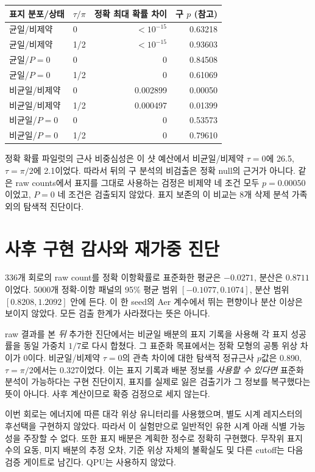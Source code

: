 \documentclass[11pt,a4paper]{article}
\begin{document}
\begin{center}
\begin{tabular}{@{}llrr@{}}
\toprule
표지 분포/상태 & $\tau/\pi$ & 정확 최대 확률 차이 & 구 $p$ (참고) \\
\midrule
균일/비제약 & 0 & $<10^{-15}$ & 0.63218 \\
균일/비제약 & 1/2 & $<10^{-15}$ & 0.93603 \\
균일/$P=0$ & 0 & 0 & 0.84508 \\
균일/$P=0$ & 1/2 & 0 & 0.61069 \\
비균일/비제약 & 0 & 0.002899 & 0.00050 \\
비균일/비제약 & 1/2 & 0.000497 & 0.01399 \\
비균일/$P=0$ & 0 & 0 & 0.53573 \\
비균일/$P=0$ & 1/2 & 0 & 0.79610 \\
\bottomrule
\end{tabular}
\end{center}

정확 확률 파일럿의 근사 비중심성은 이 샷 예산에서 비균일/비제약
$\tau=0$에 26.5, $\tau=\pi/2$에 2.1이었다. 따라서 뒤의
구 분석의 비검출은 정확 null의 근거가 아니다. 같은 raw counts에서 표지를
그대로 사용하는 검정은 비제약 네 조건 모두 $p=0.00050$이었고,
$P=0$ 네 조건은 검출되지 않았다. 표지 보존의 이 비교는
8개 삭제 분석 가족 외의 탐색적 진단이다.

\section{사후 구현 감사와 재가중 진단}
336개 회로의 raw count를 정확 이항확률로 표준화한 평균은
$-0.0271$, 분산은 $0.8711$이었다. 5000개 정확-이항 패널의
95\% 평균 범위 $[-0.1077,0.1074]$, 분산 범위
$[0.8208,1.2092]$ 안에 든다. 이 한 seed의 Aer 계수에서
뛰는 편향이나 분산 이상은 보이지 않았다. 모든 검출 한계가
사라졌다는 뜻은 아니다.

raw 결과를 본 \emph{뒤} 추가한 진단에서는 비균일 배분의 표지
기록을 사용해 각 표지 성공률을 동일 가중치 $1/7$로 다시 합쳤다.
그 표준화 목표에서는 정확 모형의 공통 위상 차이가 0이다.
비균일/비제약 $\tau=0$의 관측 차이에 대한 탐색적 정규근사
$p$값은 0.890, $\tau=\pi/2$에서는 0.327이었다.
이는 표지 기록과 배분 정보를 \emph{사용할 수 있다면} 표준화
분석이 가능하다는 구현 진단이지, 표지를 실제로 잃은 검출기가
그 정보를 복구했다는 뜻이 아니다. 사후 계산이므로 확증
검정으로 세지 않는다.

이번 회로는 에너지에 따른 대각 위상 유니터리를 사용했으며,
별도 시계 레지스터의 후선택을 구현하지 않았다. 따라서 이 실험만으로
일반적인 유한 시계 아래 식별 가능성을 주장할 수 없다.
또한 표지 배분은 계획한 정수로 정확히 구현했다. 무작위 표지 수의
요동, 미지 배분의 추정 오차, 기준 위상 자체의 불확실도 및 다른
cutoff는 다음 검증 게이트로 남긴다. QPU는 사용하지 않았다.
\end{document}

